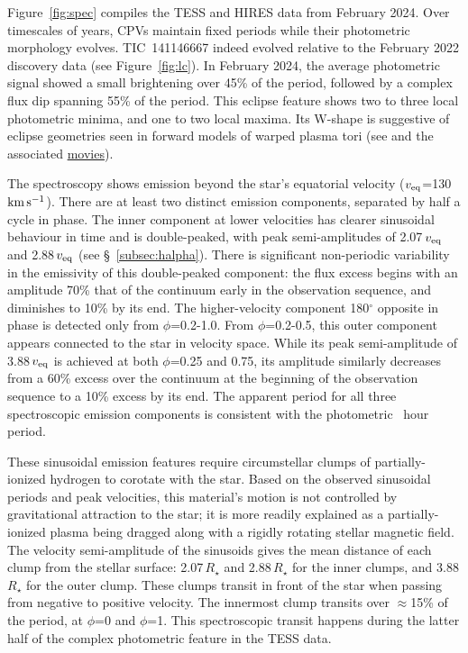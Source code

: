 \documentclass{nature3}
\newcommand{\kms}{\ensuremath{\rm km\,s^{-1}}}
\begin{document}
Figure~\ref{fig:spec} compiles the TESS and HIRES data from February
2024.  Over timescales of years, CPVs maintain fixed periods while
their photometric morphology evolves.  TIC~141146667 indeed evolved
relative to the February 2022 discovery data (see Figure~\ref{fig:lc}).
In February 2024, the average photometric signal showed a small
brightening over 45\% of the period, followed by a complex flux dip
spanning 55\% of the period.  This eclipse feature shows two to three
local photometric minima, and one to two local maxima.  Its W-shape is
suggestive of eclipse geometries seen in forward models of warped
plasma tori (see \cite{Townsend2008} and the associated
\href{http://user.astro.wisc.edu/~townsend/static.php?ref=rrm-movies#Download_Bundles}{movies}).

The spectroscopy shows emission beyond the star's equatorial velocity
($v_{\rm eq}$=130\,\kms).  There are at least two distinct emission
components, separated by half a cycle in phase.  The inner component at
lower velocities has clearer sinusoidal behaviour in time and is
double-peaked, with peak semi-amplitudes of 2.07\,$v_{\rm eq}$ and
2.88\,$v_{\rm eq}$ (see \S~\ref{subsec:halpha}).  There is significant
non-periodic variability in the emissivity of this double-peaked
component: the flux excess begins with an amplitude 70\% that of the
continuum early in the observation sequence, and diminishes to 10\% by
its end.  The higher-velocity component 180$^\circ$ opposite in phase is
detected only from $\phi$=0.2-1.0.  From $\phi$=0.2-0.5, this outer
component appears connected to the star in velocity space.  While its
peak semi-amplitude of 3.88\,$v_{\rm eq}$ is achieved at both
$\phi$=0.25 and 0.75, its amplitude similarly decreases from a 60\%
excess over the continuum at the beginning of the observation sequence
to a 10\% excess by its end.  The apparent period for all three
spectroscopic emission components is consistent with the photometric
\periodhr\ hour period.  

These sinusoidal emission features require circumstellar clumps of
partially-ionized hydrogen to corotate with the star.  Based on the
observed sinusoidal periods and peak velocities, this material's motion
is not controlled by gravitational attraction to the star; it is more
readily explained as a partially-ionized plasma being dragged along with
a rigidly rotating stellar magnetic field.  The velocity semi-amplitude
of the sinusoids gives the mean distance of each clump from the stellar
surface: 2.07\,$R_\star$ and 2.88\,$R_\star$ for the inner clumps, and
3.88\,$R_\star$ for the outer clump.   These clumps transit in front of
the star when passing from negative to positive velocity.  The innermost
clump transits over $\approx$15\% of the period, at $\phi$=0 and
$\phi$=1.  This spectroscopic transit happens during the latter half of
the complex photometric feature in the TESS data.
\end{document}
